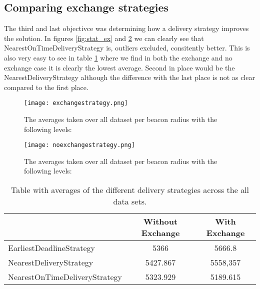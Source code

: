 \documentclass[../main.tex]{subfiles}
\begin{document}
\subsection{Comparing exchange strategies}
The third and last objectivce was determining how a delivery strategy improves the solution.
In figures \ref{fig:stat_ex} and \ref{fig:strat_noex} we can clearly see that NearestOnTimeDeliveryStrategy is, outliers excluded, consitently better. 
This is also very easy to see in table \ref{tab:avgstrat} where we find in both the exchange and no exchange case it is clearly the lowest average.
Second in place would be the NearestDeliveryStrategy although the difference with the last place is not as clear compared to the first place.
\begin{figure}
	\centering
	\texttt{[image: exchangestrategy.png]}
	\caption{The averages taken over all dataset per beacon radius with the following levels:}
	\label{fig:strat_ex}
\end{figure}

\begin{figure}
	\centering
	\texttt{[image: noexchangestrategy.png]}
	\caption{The averages taken over all dataset per beacon radius with the following levels:}
	\label{fig:strat_noex}
\end{figure}
\begin{table}
\begin{tabular}{lcc}
	\toprule
	& Without Exchange & With Exchange \\ 
	\midrule
	EarliestDeadlineStrategy & 5366 & 5666.8 \\ 
	NearestDeliveryStrategy & 5427.867 & 5558,357 \\ 
	NearestOnTimeDeliveryStrategy & 5323.929 & 5189.615 \\ 
	\bottomrule
\end{tabular}
\caption{Table with averages of the different delivery strategies across the all data sets.}
\label{tab:avgstrat}
\end{table}
\end{document}
